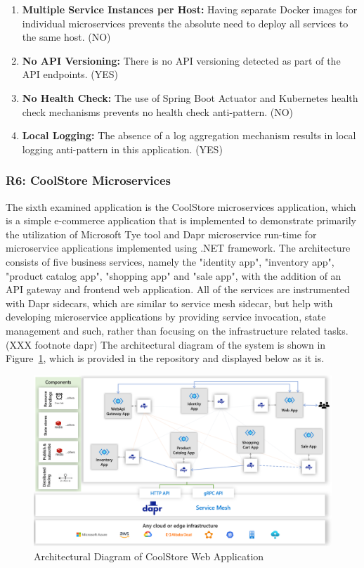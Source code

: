 \documentclass{Configuration_Files/PoliMi3i_thesis}
\begin{document}
\begin{enumerate}
    \item \textbf{Multiple Service Instances per Host:} Having separate Docker images for individual microservices prevents the absolute need to deploy all services to the same host. (NO)
    
    \item \textbf{No API Versioning:} There is no API versioning detected as part of the API endpoints. (YES)
    
    \item \textbf{No Health Check:} The use of Spring Boot Actuator and Kubernetes health check mechanisms prevents no health check anti-pattern. (NO)
    
    \item \textbf{Local Logging:} The absence of a log aggregation mechanism results in local logging anti-pattern in this application. (YES)
\end{enumerate}

\subsubsection{R6: CoolStore Microservices}
\label{subsubsec:R6}

The sixth examined application is the CoolStore microservices application, which is a simple e-commerce application that is implemented to demonstrate primarily the utilization of Microsoft Tye tool and Dapr microservice run-time for microservice applications implemented using .NET framework.
The architecture consists of five business services, namely the "identity app", "inventory app", "product catalog app", "shopping app" and "sale app", with the addition of an API gateway and frontend web application.
All of the services are instrumented with Dapr sidecars, which are similar to service mesh sidecar, but help with developing microservice applications by providing service invocation, state management and such, rather than focusing on the infrastructure related tasks. (XXX footnote dapr)
The architectural diagram of the system is shown in Figure~\ref{fig:R6_arch}, which is provided in the repository and displayed below as it is.

\begin{figure}[H]
\centering
\includegraphics[width=1\textwidth]{myImages/R6.png}
\caption{Architectural Diagram of CoolStore Web Application}
\label{fig:R6_arch}
\end{figure}
\end{document}
